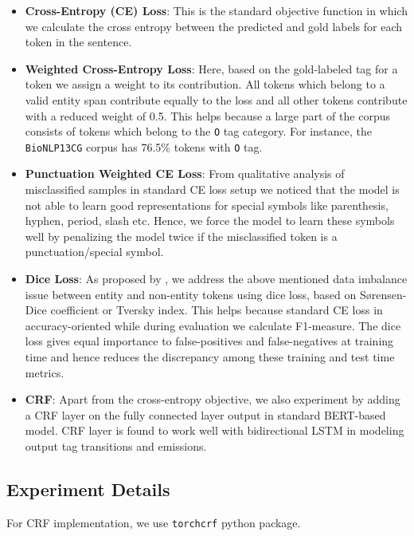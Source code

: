 \begin{itemize}
    \item \textbf{Cross-Entropy (CE) Loss}: This is the standard objective function in which we calculate the cross entropy between the predicted and gold labels for each token in the sentence.
    
    \item \textbf{Weighted Cross-Entropy Loss}: Here, based on the gold-labeled tag for a token we assign a weight to its contribution. All tokens which belong to a valid entity span contribute equally to the loss and all other tokens contribute with a reduced weight of 0.5. This helps because a large part of the corpus consists of tokens which belong to the \texttt{O} tag category. For instance, the \texttt{BioNLP13CG} corpus has 76.5\% tokens with \texttt{O} tag.
    
    \item \textbf{Punctuation Weighted CE Loss}: From qualitative analysis of misclassified samples in standard CE loss setup we noticed that the model is not able to learn good representations for special symbols like parenthesis, hyphen, period, slash etc. Hence, we force the model to learn these symbols well by penalizing the model twice if the misclassified token is a punctuation/special symbol.
    
    \item \textbf{Dice Loss}: As proposed by \cite{li2019dice}, we address the above mentioned data imbalance issue between entity and non-entity tokens using dice loss, based on S{\o}rensen-Dice coefficient\cite{} or Tversky index\cite{}. This helps because standard CE loss in accuracy-oriented while during evaluation we calculate F1-measure. The dice loss gives equal importance to false-positives and false-negatives at training time and hence reduces the discrepancy among these training and test time metrics.
    
    \item \textbf{CRF}: Apart from the cross-entropy objective, we also experiment by adding a CRF layer on the fully connected layer output in standard BERT-based model. CRF layer is found to work well with bidirectional LSTM\cite{ma2016end} in modeling output tag transitions and emissions.
    
\end{itemize}

\subsection{Experiment Details}
For CRF implementation, we use \texttt{torchcrf} python package.

